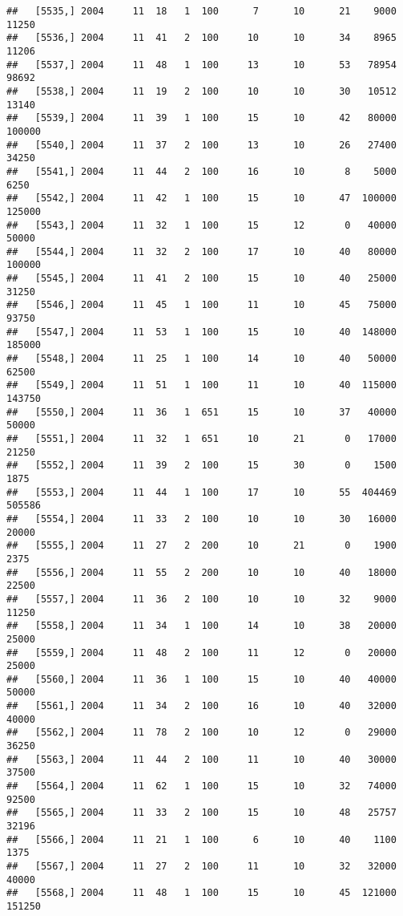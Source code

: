 \documentclass{article}\usepackage[]{graphicx}\usepackage[]{color}
\makeatletter
\newenvironment{kframe}{%
 \def\at@end@of@kframe{}%
 \ifinner\ifhmode%
  \def\at@end@of@kframe{\end{minipage}}%
  \begin{minipage}{\columnwidth}%
 \fi\fi%
 \def\FrameCommand##1{\hskip\@totalleftmargin \hskip-\fboxsep
 \colorbox{shadecolor}{##1}\hskip-\fboxsep
     \hskip-\linewidth \hskip-\@totalleftmargin \hskip\columnwidth}%
 \MakeFramed {\advance\hsize-\width
   \@totalleftmargin\z@ \linewidth\hsize
   \@setminipage}}%
 {\par\unskip\endMakeFramed%
 \at@end@of@kframe}
\newenvironment{knitrout}{}{} %
\makeatother
\begin{document}
\begin{knitrout}
\begin{kframe}
\begin{verbatim}
##   [5535,] 2004     11  18   1  100      7      10      21    9000   11250
##   [5536,] 2004     11  41   2  100     10      10      34    8965   11206
##   [5537,] 2004     11  48   1  100     13      10      53   78954   98692
##   [5538,] 2004     11  19   2  100     10      10      30   10512   13140
##   [5539,] 2004     11  39   1  100     15      10      42   80000  100000
##   [5540,] 2004     11  37   2  100     13      10      26   27400   34250
##   [5541,] 2004     11  44   2  100     16      10       8    5000    6250
##   [5542,] 2004     11  42   1  100     15      10      47  100000  125000
##   [5543,] 2004     11  32   1  100     15      12       0   40000   50000
##   [5544,] 2004     11  32   2  100     17      10      40   80000  100000
##   [5545,] 2004     11  41   2  100     15      10      40   25000   31250
##   [5546,] 2004     11  45   1  100     11      10      45   75000   93750
##   [5547,] 2004     11  53   1  100     15      10      40  148000  185000
##   [5548,] 2004     11  25   1  100     14      10      40   50000   62500
##   [5549,] 2004     11  51   1  100     11      10      40  115000  143750
##   [5550,] 2004     11  36   1  651     15      10      37   40000   50000
##   [5551,] 2004     11  32   1  651     10      21       0   17000   21250
##   [5552,] 2004     11  39   2  100     15      30       0    1500    1875
##   [5553,] 2004     11  44   1  100     17      10      55  404469  505586
##   [5554,] 2004     11  33   2  100     10      10      30   16000   20000
##   [5555,] 2004     11  27   2  200     10      21       0    1900    2375
##   [5556,] 2004     11  55   2  200     10      10      40   18000   22500
##   [5557,] 2004     11  36   2  100     10      10      32    9000   11250
##   [5558,] 2004     11  34   1  100     14      10      38   20000   25000
##   [5559,] 2004     11  48   2  100     11      12       0   20000   25000
##   [5560,] 2004     11  36   1  100     15      10      40   40000   50000
##   [5561,] 2004     11  34   2  100     16      10      40   32000   40000
##   [5562,] 2004     11  78   2  100     10      12       0   29000   36250
##   [5563,] 2004     11  44   2  100     11      10      40   30000   37500
##   [5564,] 2004     11  62   1  100     15      10      32   74000   92500
##   [5565,] 2004     11  33   2  100     15      10      48   25757   32196
##   [5566,] 2004     11  21   1  100      6      10      40    1100    1375
##   [5567,] 2004     11  27   2  100     11      10      32   32000   40000
##   [5568,] 2004     11  48   1  100     15      10      45  121000  151250

\end{verbatim}
\end{kframe}
\end{knitrout}
\end{document}
